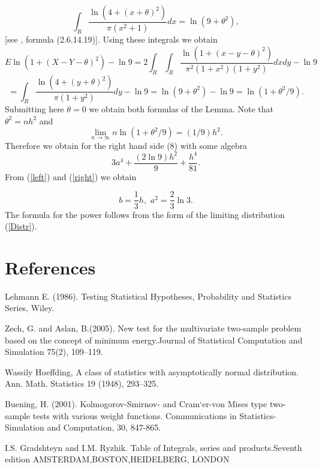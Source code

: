\documentclass[final,11pt,3p]{elsarticle}
\begin{document}
\begin{equation}
\label{i3}
\int_{R} \frac{\ln(4 +(x +\theta)^2 )}{\pi(x^2 +1)} dx = \ln(9+\theta^2),
\end{equation}
[see  \cite{PrudBrychMarich1981}, formula (2.6.14.19)].
Using these integrals we obtain
\begin{equation}
 E \ln(1+ (X- Y - \theta)^2)-\ln 9  = 2\int_{R} \int_{R} \frac{\ln(1+(x-y-\theta)^2)}{\pi^2(1+x^2)(1+y^2)} dx dy -\ln 9
\end{equation}
\begin{equation}
= \int_{R}\frac{\ln(4 +(y+\theta)^2)}{\pi(1+y^2)} dy- \ln 9= \ln(9+\theta^2) -\ln 9 = \ln(1+ \theta^2/9).
\end{equation}
Submitting here  $\theta=0$ we obtain both formulas of the Lemma.
Note that $\theta^2=nh^2$ and
$$
\lim_{n\to \infty} n \ln(1+ \theta^2/9)= (1/9)h^2.
$$
Therefore we obtain for the right hand side (8) with some algebra
\begin{equation}\label{right}
3a^4 + \frac{(2\ln 9 )h^2}{9} + \frac{h^4}{81}.
 \end{equation}
 From (\ref{left}) and  (\ref{right}) we obtain

$$
b=\frac{1}{3} h,\,\,a^2=\frac{2}{3}\ln 3.
$$
The formula for the power follows from the form of the limiting distribution  (\ref{Distr}).





\section{References}
 Lehmann E. (1986).  Testing  Statistical  Hypotheses,  Probability  and  Statistics  Series,  Wiley.

Zech,  G. and Aslan, B.(2005).   New test for the multivariate two-sample problem based on the concept of minimum energy.Journal of Statistical Computation and Simulation 75(2), 109–119.

 Wassily Hoeffding, A class of statistics with asymptotically normal distribution.
Ann. Math. Statistics 19 (1948), 293–325.

Buening, H. (2001). Kolmogorov-Smirnov- and Cram`er-von Mises type two-sample tests with various weight functions. Communications in Statistics-
Simulation and Computation, 30, 847-865.

I.S. Gradshteyn and I.M. Ryzhik. Table of Integrals, series and products.Seventh edition AMSTERDAM,BOSTON,HEIDELBERG, LONDON
\end{document}
